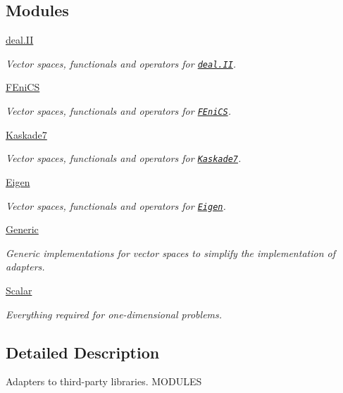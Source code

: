 \subsection*{Modules}
\begin{DoxyCompactItemize}
\item 
\hyperlink{group__dealIIGroup}{deal.\-I\-I}
\begin{DoxyCompactList}\small\item\em Vector spaces, functionals and operators for \href{http://www.dealii.org}{\tt deal.\-I\-I}. \end{DoxyCompactList}\item 
\hyperlink{group__FenicsGroup}{F\-Eni\-C\-S}
\begin{DoxyCompactList}\small\item\em Vector spaces, functionals and operators for \href{http://www.fenicsproject.org}{\tt F\-Eni\-C\-S}. \end{DoxyCompactList}\item 
\hyperlink{group__KaskadeGroup}{Kaskade7}
\begin{DoxyCompactList}\small\item\em Vector spaces, functionals and operators for \href{http://www.zib.de/projects/kaskade7-finite-element-toolbox}{\tt Kaskade7}. \end{DoxyCompactList}\item 
\hyperlink{group__EigenGroup}{Eigen}
\begin{DoxyCompactList}\small\item\em Vector spaces, functionals and operators for \href{http://eigen.tuxfamily.org}{\tt Eigen}. \end{DoxyCompactList}\item 
\hyperlink{group__GenericGroup}{Generic}
\begin{DoxyCompactList}\small\item\em Generic implementations for vector spaces to simplify the implementation of adapters. \end{DoxyCompactList}\item 
\hyperlink{group__ScalarGroup}{Scalar}
\begin{DoxyCompactList}\small\item\em Everything required for one-\/dimensional problems. \end{DoxyCompactList}\end{DoxyCompactItemize}


\subsection{Detailed Description}
Adapters to third-\/party libraries. M\-O\-D\-U\-L\-E\-S 